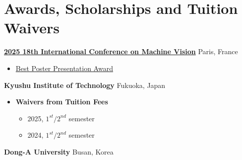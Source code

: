 \documentclass[a4paper,9pt]{extarticle}
\begin{document}
\section*{Awards, Scholarships and Tuition Waivers}
\large{\textbf{\href{https://icmv.org}{2025 18th International Conference on Machine Vision}}} \hfill Paris, France
\begin{itemize}
    \item \href{https://github.com/user-attachments/assets/53461ed5-0c97-4db9-8181-8551847832b3}{Best Poster Presentation Award}
\end{itemize}
\noindent
\large{\textbf{Kyushu Institute of Technology}} \hfill Fukuoka, Japan
\begin{itemize}
    \item \textbf{Waivers from Tuition Fees}
    \begin{itemize}
    \item 2025, $1^{st} / 2^{nd}$ semester 
        \item 2024, $1^{st} / 2^{nd}$ semester 
    \end{itemize} 
\end{itemize}
\noindent
\large{\textbf{Dong-A University}} \hfill Busan, Korea
\end{document}
